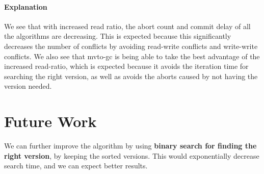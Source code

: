 \documentclass[10pt]{article}
\begin{document}
\paragraph{Explanation}
We see that with increased read ratio, the abort count and commit delay of all the algorithms are decreasing. This is expected because this significantly decreases the number of conflicts by avoiding read-write conflicts and write-write conflicts. We also see that mvto-gc is being able to take the best advantage of the increased read-ratio, which is expected because it avoids the iteration time for searching the right version, as well as avoids the aborts caused by not having the version needed.

\section{Future Work}
We can further improve the algorithm by using \textbf{binary search for finding the right version}, by keeping the sorted versions. This would exponentially decrease search time, and we can expect better results.
\end{document}
